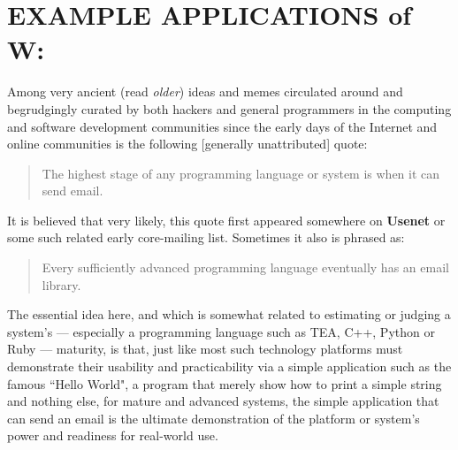 \documentclass[a4paper, 18pt]{book} %
\begin{document}
{{{ 
\section{EXAMPLE APPLICATIONS of W:}
\label{SECEXAMPW}

  
Among very ancient (read \textit{older}) ideas and memes circulated around and begrudgingly curated by both hackers and general programmers in the computing and software development communities since the early days of the Internet and online communities is the following [generally unattributed] quote:


\begin{minipage}{1\textwidth}
\vspace{1em}
\begin{quotation}
{\ttfamily

The highest stage of any programming language or system is when it can send email.

}
\end{quotation}
\vspace{1em}
\end{minipage}

It is believed\cite{copilot_assistant} that very likely, this quote first appeared somewhere on \textbf{Usenet} or some such related early core-mailing list. Sometimes it also is phrased as:


\begin{minipage}{1\textwidth}
\vspace{1em}
\begin{quotation}
{\ttfamily

Every sufficiently advanced programming language eventually has an email library.

}
\end{quotation}
\vspace{1em}
\end{minipage}

The essential idea here, and which is somewhat related to estimating or judging a system's --- especially a programming language such as TEA, C++, Python or Ruby --- maturity, is that, just like most such technology platforms must demonstrate their usability and practicability via a simple application such as the famous ``Hello World"\cite{lutalo2023dnapsoe}, a program that merely show how to print a simple string and nothing else, for mature and advanced systems, the simple application that can send an email is the ultimate demonstration of the platform or system's power and readiness for real-world use.

}}}
\end{document}
